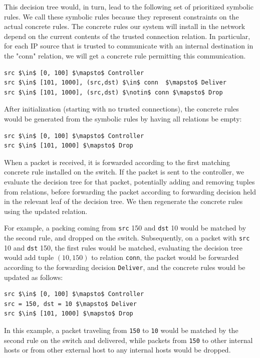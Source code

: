 \documentclass[preprint]{sigplanconf}
\begin{document}
This decision tree would, in turn, lead to the following set of prioritized symbolic rules. We call these symbolic rules because they represent constraints on the actual concrete rules. The concrete rules our system will install in the network depend on the current contents of the trusted connection relation. In particular, for each IP source that is trusted to communicate with an internal destination in the "conn" relation, we will get a concrete rule permitting this communication.
  \begin{lstlisting}[mathescape]
src $\in$ [0, 100] $\mapsto$ Controller
src $\in$ [101, 1000], (src,dst) $\in$ conn  $\mapsto$ Deliver
src $\in$ [101, 1000], (src,dst) $\notin$ conn $\mapsto$ Drop
  \end{lstlisting}

After initialization (starting with no trusted connections), the concrete rules would be generated from the symbolic rules by having all relations be empty:
\begin{lstlisting}[mathescape]
src $\in$ [0, 100] $\mapsto$ Controller  
src $\in$ [101, 1000] $\mapsto$ Drop  
\end{lstlisting}
  

  When a packet is received, it is forwarded according to the first matching concrete rule installed on the switch. If the packet is sent to the controller, we evaluate the decision tree for that packet, potentially adding and removing tuples from relations, before forwarding the packet according to forwarding decision held in the relevant leaf of the decision tree. We then regenerate the concrete rules using the updated relation.
  
  For example, a packing coming from \lstinline|src| 150 and \lstinline|dst| 10 would be matched by the second rule, and dropped on the switch.
Subsequently, on a packet with \lstinline|src| 10 and \lstinline|dst| 150, the first rules would be matched, evaluating the decision tree would add tuple $(10,150)$ to relation \lstinline|conn|, the packet would be forwarded according to the forwarding decision \lstinline|Deliver|, and the concrete rules would be updated as follows:

\begin{lstlisting}[mathescape]
src $\in$ [0, 100] $\mapsto$ Controller  
src = 150, dst = 10 $\mapsto$ Deliver  
src $\in$ [101, 1000] $\mapsto$ Drop  
\end{lstlisting}
  
In this example, a packet traveling from \lstinline|150| to \lstinline|10| would be matched by the second rule on the switch and delivered, while packets from \lstinline|150| to other internal hosts or from other external host to any internal hosts would be dropped.
\end{document}
